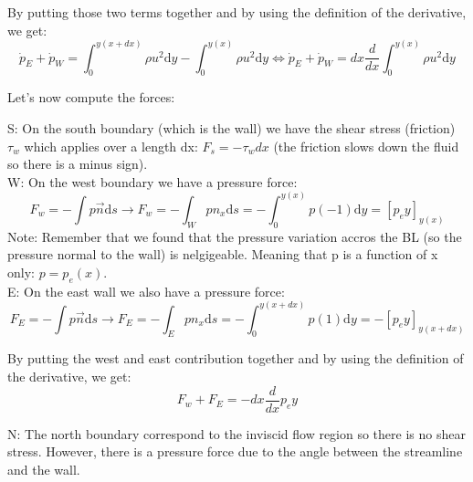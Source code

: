 By putting those two terms together and by using the definition of the derivative, we get:
\begin{equation}
\newcommand{\deriv}{\mathrm{d}}
\dot{p}_E+\dot{p}_W= \int_{0}^{y(x+dx)} \rho u^2 \deriv y - \int_{0}^{y(x)} \rho u^2 \deriv y   \Leftrightarrow \dot{p}_E+\dot{p}_W=dx \frac{d}{dx} \int_{0}^{y(x)} \rho u^2 \deriv y
\end{equation}

Let's now compute the forces:

S: On the south boundary (which is the wall) we have the shear stress (friction) $\tau_w$ which applies over a length dx:  $F_s = -\tau_w dx$ (the friction slows down the fluid so there is a minus sign).\\

W: On the west boundary we have a pressure force:
\begin{equation}
\newcommand{\deriv}{\mathrm{d}}
F_w=- \int p \vec{n} \deriv s \rightarrow  F_w=- \int_W p n_x \deriv s=-\int_0^{y(x)} p (-1) \deriv y=[p_e y]_{y(x)}
\end{equation}
Note: Remember that we found that the pressure variation accros the BL (so the pressure normal to the wall) is nelgigeable. Meaning that p is a function of x only: $p=p_e(x)$.\\

E: On the east wall we also have a pressure force:
\begin{equation}
\newcommand{\deriv}{\mathrm{d}}
F_E=- \int p \vec{n} \deriv s \rightarrow  F_E=- \int_E p n_x \deriv s=-\int_0^{y(x+dx)} p (1) \deriv y=-[p_e y]_{y(x+dx)}
\end{equation}
	
By putting the west and east contribution together and by using the definition of the derivative, we get:
\begin{equation}
\newcommand{\deriv}{\mathrm{d}}
F_w+F_E=- dx \frac{d}{dx} p_ey
\end{equation}

N: The north boundary correspond to the inviscid flow region so there is no shear stress. However, there is a pressure force due to the angle between the streamline and the wall.

